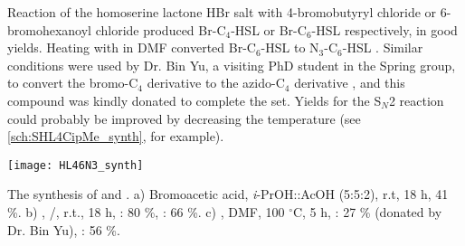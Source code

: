 Reaction of the homoserine lactone HBr salt  with 4-bromobutyryl chloride  or 6-bromohexanoyl chloride  produced Br-C$_4$-HSL  or Br-C$_6$-HSL  respectively, in good yields. Heating with  in DMF converted Br-C$_6$-HSL  to N$_3$-C$_6$-HSL . 
Similar conditions were used by Dr. Bin Yu, a visiting PhD student in the Spring group, to convert the bromo-C$_4$ derivative  to the azido-C$_4$ derivative , and this compound was kindly donated to complete the set. 
Yields for the S$_N$2 reaction could probably be improved by decreasing the temperature (see \ref{sch:SHL4CipMe_synth}, for example).

\begin{scheme}[H]
	\begin{center}
		\texttt{[image: HL46N3\_synth]}
		\caption{The synthesis of  and .
		a) Bromoacetic acid, \textit{i}-PrOH::AcOH (5:5:2), r.t, 18 h, 41 \%.
		b) , /, r.t., 18 h, : 80 \%, : 66 \%.
		c) , DMF, 100 $^{\circ}$C, 5 h, : 27 \% (donated by Dr. Bin Yu), : 56 \%.
		\label{sch:HL46N3_synth}}
	\end{center}
\end{scheme}